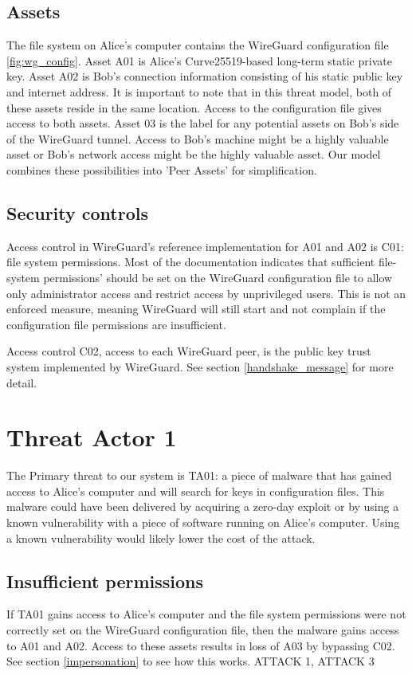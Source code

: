 \documentclass [11pt, proquest] {uwthesis}[2020/02/24]
\begin{document}
\subsection{Assets}
The file system on Alice's computer contains the WireGuard configuration file \ref{fig:wg_config}. 
Asset A01 is Alice's Curve25519-based long-term static private key. Asset A02 is Bob's connection information consisting of his static public key and internet address. It is important to note that in this threat model, both of these assets reside in the same location. Access to the configuration file gives access to both assets.
Asset 03 is the label for any potential assets on Bob's side of the WireGuard tunnel. Access to Bob's machine might be a highly valuable asset or Bob's network access might be the highly valuable asset. Our model combines these possibilities into 'Peer Assets' for simplification.

\subsection{Security controls}
Access control in WireGuard's reference implementation for A01 and A02 is C01: file system permissions. Most of the documentation indicates that sufficient file-system permissions' should be set on the WireGuard configuration file to allow only administrator access and restrict access by unprivileged users. This is not an enforced measure, meaning WireGuard will still start and not complain if the configuration file permissions are insufficient. 

Access control C02, access to each WireGuard peer, is the public key trust system implemented by WireGuard. See section \ref{handshake_message} for more detail.

\section{Threat Actor 1}
The Primary threat to our system is TA01: a piece of malware that has gained access to Alice's computer and will search for keys in configuration files. This malware could have been delivered by acquiring a zero-day exploit or by using a known vulnerability with a piece of software running on Alice's computer. Using a known vulnerability would likely lower the cost of the attack.


\subsection{Insufficient permissions}
If TA01 gains access to Alice's computer and the file system permissions were not correctly set on the WireGuard configuration file, then the malware gains access to A01 and A02. Access to these assets results in loss of A03 by bypassing C02. See section \ref{impersonation} to see how this works. 
ATTACK 1, ATTACK 3
\end{document}
